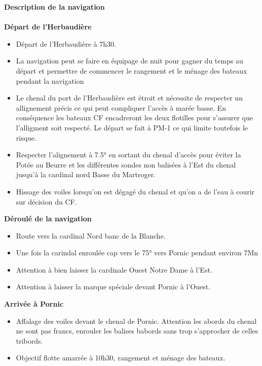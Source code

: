 \begin{minipage}[c][\textheight][t]{0.10\textwidth}
\hfill
\end{minipage}%
\begin{minipage}[c][\textheight][t]{0.50\textwidth}
    \vspace{2cm}
    \color{StrongBlue}
            {\huge \textbf{Description de la navigation}}\\
            \vspace{0.1cm}\\
            {\large \textbf{Départ de l'Herbaudière}}\\
            \begin{itemize}
                \itemsep0em 
                \item Départ de l'Herbaudière à 7h30. 
                \item La navigation peut se faire en équipage de nuit pour gagner du temps au départ et permettre de commencer le rangement et le ménage des bateaux pendant la navigation
                \item Le chenal du port de l'Herbaudière est étroit et nécessite de respecter un allignement précis ce qui peut compliquer l'accès à marée basse. En conséquence les bateaux CF encadreront les deux flotilles pour s'assurer que l'alligment soit respecté. Le départ se fait à PM-1 ce qui limite toutefois le risque. 
                \item Respecter l'alignement à 7.5° en sortant du chenal d'accès pour éviter la Potée au Beurre et les différentes sondes non balisées à l'Est du chenal jusqu'à la cardinal nord Basse du Martroger.
                \item Hissage des voiles lorsqu'on est dégagé du chenal et qu'on a de l'eau à courir sur décision du CF. 
            \end{itemize}
            {\large \textbf{Déroulé de la navigation}}\\
            \begin{itemize}
                \itemsep0em 
                \item Route vers la cardinal Nord banc de la Blanche. 
                \item Une fois la carindal enroulée cap vers le 75° vers Pornic pendant environ 7Mn
                \item Attention à bien laisser la cardinale Ouest Notre Dame à l'Est. 
                \item Attention à laisser la marque spéciale devant Pornic à l'Ouest. 
            \end{itemize}
        
        {\large \textbf{Arrivée à Pornic}}\\
            \begin{itemize}
                \itemsep0em 
                \item Affalage des voiles devant le chenal de Pornic. Attention les abords du chenal ne sont pas francs, enrouler les balises babords sans trop s'approcher de celles tribords.
                \item Objectif flotte amarrée à 10h30, rangement et ménage des bateaux.
            \end{itemize}
\end{minipage}%
